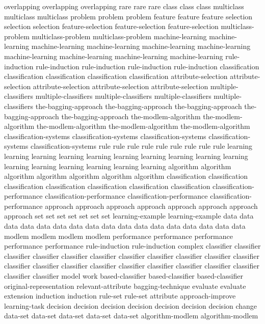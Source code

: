 overlapping	overlapping	overlapping	
rare	rare	rare	
class	class	class	
multiclass	multiclass	multiclass	
problem	problem	problem	
feature	feature	feature	
selection	selection	selection	
feature-selection	feature-selection	feature-selection	
multiclass-problem	multiclass-problem	multiclass-problem	
machine-learning	machine-learning	machine-learning	machine-learning	machine-learning	machine-learning	machine-learning	machine-learning	machine-learning	machine-learning	
rule-induction	rule-induction	rule-induction	rule-induction	rule-induction	
classification	classification	classification	classification	classification	
attribute-selection	attribute-selection	attribute-selection	attribute-selection	attribute-selection	
multiple-classifiers	multiple-classifiers	multiple-classifiers	multiple-classifiers	multiple-classifiers	
the-bagging-approach	the-bagging-approach	the-bagging-approach	the-bagging-approach	the-bagging-approach	
the-modlem-algorithm	the-modlem-algorithm	the-modlem-algorithm	the-modlem-algorithm	the-modlem-algorithm	
classification-systems	classification-systems	classification-systems	classification-systems	classification-systems	
rule	rule	rule	rule	rule	rule	rule	rule	rule	
learning	learning	learning	learning	learning	learning	learning	learning	learning	learning	learning	learning	learning	learning	learning	learning	
algorithm	algorithm	algorithm	algorithm	algorithm	algorithm	algorithm	
classification	classification	classification	classification	classification	classification	classification	
classification-performance	classification-performance	classification-performance	classification-performance	
approach	approach	approach	approach	approach	approach	approach	approach	
set	set	set	set	set	set	set	
learning-example	learning-example	
data	data	data	data	data	data	data	data	data	data	data	data	data	data	data	data	data	
modlem	modlem	modlem	modlem	
performance	performance	performance	performance	performance	
rule-induction	rule-induction	
complex	
classifier	classifier	classifier	classifier	classifier	classifier	classifier	classifier	classifier	classifier	classifier	classifier	classifier	classifier	classifier	classifier	classifier	classifier	classifier	classifier	classifier	classifier	
model	
work	
based-classifier	based-classifier	based-classifier	
original-representation	
relevant-attribute	
bagging-technique	
evaluate	evaluate	
extension	
induction	induction	
rule-set	rule-set	
attribute	
approach-improve	
learning-task	
decision	decision	decision	decision	decision	decision	decision	
change	
data-set	data-set	data-set	data-set	data-set	
algorithm-modlem	algorithm-modlem	
